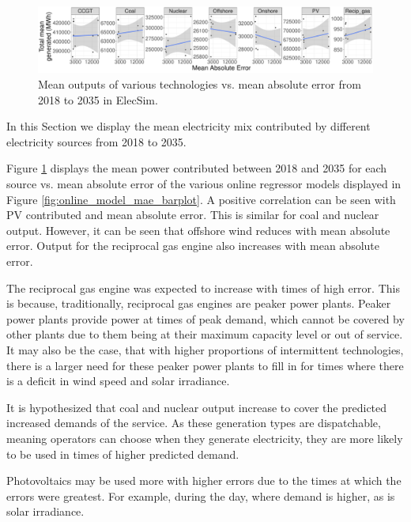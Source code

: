 \documentclass[final,3p,times,twocolumn,numbers]{elsarticle}
\begin{document}
\begin{figure}[h]
\includegraphics[width=\columnwidth,natwidth=700,natheight=485]{figures/results/contributed_total_plot.pdf}
\caption{Mean outputs of various technologies vs. mean absolute error from 2018 to 2035 in ElecSim.}
\label{fig:pv_coal_nuclear_offshore_outputs}
\end{figure}


In this Section we display the mean electricity mix contributed by different electricity sources from 2018 to 2035. 

Figure \ref{fig:pv_coal_nuclear_offshore_outputs} displays the mean power contributed between 2018 and 2035 for each source vs. mean absolute error of the various online regressor models displayed in Figure \ref{fig:online_model_mae_barplot}. A positive correlation can be seen with PV contributed and mean absolute error. This is similar for coal and nuclear output. However, it can be seen that offshore wind reduces with mean absolute error. Output for the reciprocal gas engine also increases with mean absolute error.

The reciprocal gas engine was expected to increase with times of high error. This is because, traditionally, reciprocal gas engines are peaker power plants. Peaker power plants provide power at times of peak demand, which cannot be covered by other plants due to them being at their maximum capacity level or out of service. It may also be the case, that with higher proportions of intermittent technologies, there is a larger need for these peaker power plants to fill in for times where there is a deficit in wind speed and solar irradiance.

It is hypothesized that coal and nuclear output increase to cover the predicted increased demands of the service. As these generation types are dispatchable, meaning operators can choose when they generate electricity, they are more likely to be used in times of higher predicted demand.

Photovoltaics may be used more with higher errors due to the times at which the errors were greatest. For example, during the day, where demand is higher, as is solar irradiance.
\end{document}
